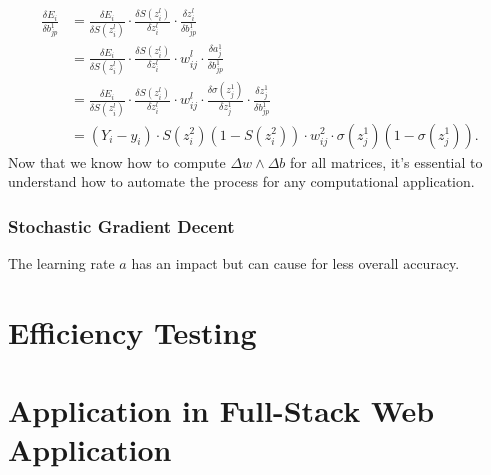 \documentclass[11pt,letterpaper]{amsbook}
\theoremstyle{definition}
\numberwithin{definition}{chapter}
\numberwithin{exercise}{chapter}
\numberwithin{section}{chapter}
\begin{document}
\begin{align}
    \frac{\delta E_i}{\delta b^1_{jp}} &=   \frac{\delta E_i}{\delta S(z^l_i)} \cdot \frac{\delta S(z^l_i)}{\delta z^l_i} \cdot \frac{\delta z^l_i}{\delta b^1_{jp}} \\
&= \frac{\delta E_i}{\delta S(z^l_i)} \cdot \frac{\delta S(z^l_i)}{\delta z^l_i} \cdot w^l_{ij} \cdot \frac{\delta a^1_j}{\delta b^1_{jp}} \\ &= \frac{\delta E_i}{\delta S(z^l_i)} \cdot \frac{\delta S(z^l_i)}{\delta z^l_i} \cdot w^l_{ij} \cdot \frac{\delta \sigma(z^1_j)}{\delta z^1_j} \cdot \frac{\delta z^1_j}{\delta b^1_{jp}} \\ &= (Y_i - y_i) \cdot S(z^2_i)(1 - S(z^2_i)) \cdot w^2_{ij} \cdot \sigma(z^1_j)(1 - \sigma(z^1_j)).
\end{align}
Now that we know how to compute $\Delta w \land \Delta b$ for all matrices, it's essential to understand how to automate the process for any computational application.
\vspace{2em} 


\subsubsection{Stochastic Gradient Decent}
The learning rate $a$ has an impact but can cause for less overall accuracy. 
\section{Efficiency Testing}

\section{Application in Full-Stack Web Application}
\end{document}
